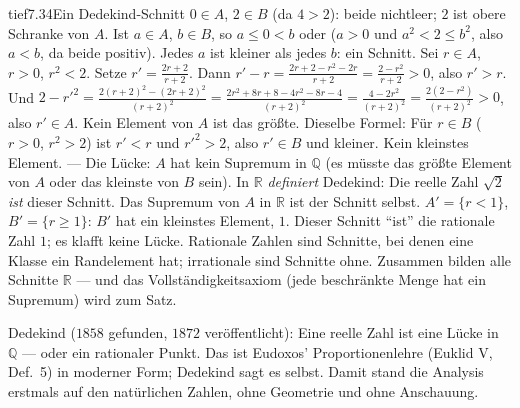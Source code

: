 \begin{loesungkarte}{tief}{7.34}{Ein Dedekind-Schnitt}
$0\in A$, $2\in B$ (da $4 > 2$): beide nichtleer; $2$ ist obere Schranke von $A$. Ist $a\in A$, $b\in B$, so $a\le0 < b$ oder ($a > 0$ und $a^{2} < 2\le b^{2}$, also $a < b$, da beide positiv). Jedes $a$ ist kleiner als jedes $b$: ein Schnitt.
Sei $r\in A$, $r > 0$, $r^{2} < 2$. Setze $r' = \frac{2r + 2}{r + 2}$. Dann $r' - r = \frac{2r + 2 - r^{2} - 2r}{r + 2} = \frac{2 - r^{2}}{r + 2} > 0$, also $r' > r$. Und $2 - r'^{2} = \frac{2(r + 2)^{2} - (2r + 2)^{2}}{(r + 2)^{2}} = \frac{2r^{2} + 8r + 8 - 4r^{2} - 8r - 4}{(r + 2)^{2}} = \frac{4 - 2r^{2}}{(r + 2)^{2}} = \frac{2(2 - r^{2})}{(r + 2)^{2}} > 0$, also $r'\in A$. Kein Element von $A$ ist das größte.
Dieselbe Formel: Für $r\in B$ ($r > 0$, $r^{2} > 2$) ist $r' < r$ und $r'^{2} > 2$, also $r'\in B$ und kleiner. Kein kleinstes Element. --- Die Lücke: $A$ hat kein Supremum in $\mathbb Q$ (es müsste das größte Element von $A$ oder das kleinste von $B$ sein). In $\mathbb R$ \emph{definiert} Dedekind: Die reelle Zahl $\sqrt2$ \emph{ist} dieser Schnitt. Das Supremum von $A$ in $\mathbb R$ ist der Schnitt selbst.
$A' = \{r < 1\}$, $B' = \{r\ge1\}$: $B'$ hat ein kleinstes Element, $1$. Dieser Schnitt \enquote{ist} die rationale Zahl $1$; es klafft keine Lücke. Rationale Zahlen sind Schnitte, bei denen eine Klasse ein Randelement hat; irrationale sind Schnitte ohne. Zusammen bilden alle Schnitte $\mathbb R$ --- und das Vollständigkeitsaxiom (jede beschränkte Menge hat ein Supremum) wird zum Satz.
\begin{mitnehmen}\kastentext
Dedekind ($1858$ gefunden, $1872$ veröffentlicht): Eine reelle Zahl ist eine Lücke in $\mathbb Q$ --- oder ein rationaler Punkt. Das ist Eudoxos' Proportionenlehre (Euklid V, Def.\ 5) in moderner Form; Dedekind sagt es selbst. Damit stand die Analysis erstmals auf den natürlichen Zahlen, ohne Geometrie und ohne Anschauung.
\end{mitnehmen}
\end{loesungkarte}

